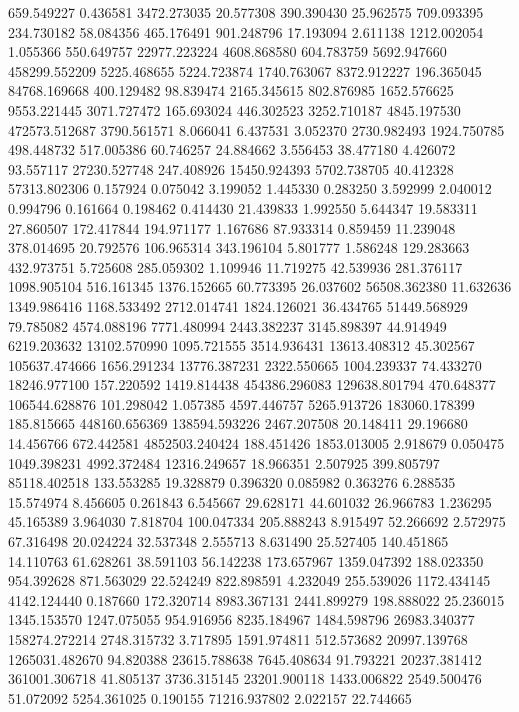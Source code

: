 659.549227
0.436581
3472.273035
20.577308
390.390430
25.962575
709.093395
234.730182
58.084356
465.176491
901.248796
17.193094
2.611138
1212.002054
1.055366
550.649757
22977.223224
4608.868580
604.783759
5692.947660
458299.552209
5225.468655
5224.723874
1740.763067
8372.912227
196.365045
84768.169668
400.129482
98.839474
2165.345615
802.876985
1652.576625
9553.221445
3071.727472
165.693024
446.302523
3252.710187
4845.197530
472573.512687
3790.561571
8.066041
6.437531
3.052370
2730.982493
1924.750785
498.448732
517.005386
60.746257
24.884662
3.556453
38.477180
4.426072
93.557117
27230.527748
247.408926
15450.924393
5702.738705
40.412328
57313.802306
0.157924
0.075042
3.199052
1.445330
0.283250
3.592999
2.040012
0.994796
0.161664
0.198462
0.414430
21.439833
1.992550
5.644347
19.583311
27.860507
172.417844
194.971177
1.167686
87.933314
0.859459
11.239048
378.014695
20.792576
106.965314
343.196104
5.801777
1.586248
129.283663
432.973751
5.725608
285.059302
1.109946
11.719275
42.539936
281.376117
1098.905104
516.161345
1376.152665
60.773395
26.037602
56508.362380
11.632636
1349.986416
1168.533492
2712.014741
1824.126021
36.434765
51449.568929
79.785082
4574.088196
7771.480994
2443.382237
3145.898397
44.914949
6219.203632
13102.570990
1095.721555
3514.936431
13613.408312
45.302567
105637.474666
1656.291234
13776.387231
2322.550665
1004.239337
74.433270
18246.977100
157.220592
1419.814438
454386.296083
129638.801794
470.648377
106544.628876
101.298042
1.057385
4597.446757
5265.913726
183060.178399
185.815665
448160.656369
138594.593226
2467.207508
20.148411
29.196680
14.456766
672.442581
4852503.240424
188.451426
1853.013005
2.918679
0.050475
1049.398231
4992.372484
12316.249657
18.966351
2.507925
399.805797
85118.402518
133.553285
19.328879
0.396320
0.085982
0.363276
6.288535
15.574974
8.456605
0.261843
6.545667
29.628171
44.601032
26.966783
1.236295
45.165389
3.964030
7.818704
100.047334
205.888243
8.915497
52.266692
2.572975
67.316498
20.024224
32.537348
2.555713
8.631490
25.527405
140.451865
14.110763
61.628261
38.591103
56.142238
173.657967
1359.047392
188.023350
954.392628
871.563029
22.524249
822.898591
4.232049
255.539026
1172.434145
4142.124440
0.187660
172.320714
8983.367131
2441.899279
198.888022
25.236015
1345.153570
1247.075055
954.916956
8235.184967
1484.598796
26983.340377
158274.272214
2748.315732
3.717895
1591.974811
512.573682
20997.139768
1265031.482670
94.820388
23615.788638
7645.408634
91.793221
20237.381412
361001.306718
41.805137
3736.315145
23201.900118
1433.006822
2549.500476
51.072092
5254.361025
0.190155
71216.937802
2.022157
22.744665
